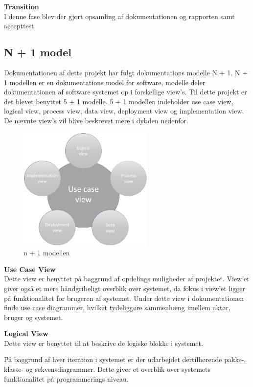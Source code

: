 \textbf{Transition}\\
I denne fase blev der gjort opsamling af dokumentationen og rapporten samt accepttest.

\subsection{N + 1 model}
Dokumentationen af dette projekt har fulgt dokumentations modelle N + 1. N + 1 modellen er en dokumentations model for software, modelle deler dokumentationen af software systemet op i forskellige view's. Til dette projekt er det blevet benyttet 5 + 1 modelle. 5 + 1 modellen indeholder use case view, logical view, process view, data view, deployment view og implementation view. De nævnte view's vil blive beskrevet mere i dybden nedenfor. 

\begin{figure}[H]
	\centering
	\includegraphics[width=0.60\textwidth]{Billeder/Udviklingsproces/n+1}
	\caption{n + 1 modellen}
	\label{fig:n+1}
\end{figure}

\textbf{Use Case View}\\
Dette view er benyttet på baggrund af opdelings muligheder af projektet. View'et giver også et mere håndgribeligt overblik over systemet, da fokus i view'et ligger på funktionalitet for brugeren af systemet. Under dette view i dokumentationen finde use case diagrammer, hvilket tydeliggøre sammenhæng imellem aktør, bruger og systemet.

\textbf{Logical View}\\
Dette view er benyttet til at beskrive de logiske blokke i systemet.

På baggrund af hver iteration i systemet er der udarbejdet dertilhørende pakke-, klasse- og sekvensdiagrammer. Dette giver et overblik over systemets funktionalitet på programmerings niveau.

